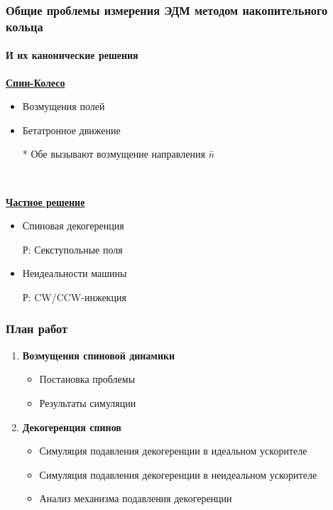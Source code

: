 \documentclass[14pt]{beamer}
\begin{document}
\begin{frame}\frametitle{Общие проблемы измерения ЭДМ методом накопительного кольца}\framesubtitle{И их канонические решения}
\begin{minipage}[t]{.5\linewidth}
	\underline{\textbf{Спин-Колесо}}
	\begin{itemize}
		\item Возмущения полей
		\item Бетатронное движение
		\item[*] Обе вызывают возмущение направления $\bar n$
	\end{itemize}
\end{minipage}~%
\begin{minipage}[t]{.5\linewidth}
	\underline{\textbf{Частное решение}}
	\begin{itemize}
		\item Спиновая декогеренция
		\item[Р:] Секступольные поля
		\item Неидеальности машины
		\item[Р:] CW/CCW-инжекция
	\end{itemize}
\end{minipage}
\end{frame}
\begin{frame}
\frametitle{План работ}
\begin{enumerate}
  \item \textbf{Возмущения спиновой динамики}
  \begin{itemize}
  	\item Постановка проблемы
  	\item Результаты симуляции
  \end{itemize}
  \item \textbf{Декогеренция спинов}
  \begin{itemize}
    \item Симуляция подавления декогеренции в идеальном ускорителе
    \item Симуляция подавления декогеренции в неидеальном ускорителе
    \item Анализ механизма подавления декогеренции
  \end{itemize}
\end{enumerate}
\end{frame}
\end{document}

